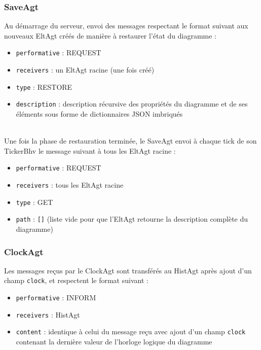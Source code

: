 \subsubsection{SaveAgt}
Au démarrage du serveur, envoi des messages respectant le format suivant aux nouveaux EltAgt créés de manière à restaurer l'état du diagramme :
\begin{itemize}
	\item \lstinline$performative$ : REQUEST
	\item \lstinline$receivers$ : un EltAgt racine (une fois créé)
	\item \lstinline$type$ : RESTORE
	\item \lstinline$description$ : description récursive des propriétés du diagramme et de ses éléments sous forme de dictionnaires JSON imbriqués
\end{itemize}
~\\
Une fois la phase de restauration terminée, le SaveAgt envoi à chaque tick de son TickerBhv le message suivant à tous les EltAgt racine :
\begin{itemize}
	\item \lstinline$performative$ : REQUEST
	\item \lstinline$receivers$ : tous les EltAgt racine
	\item \lstinline$type$ : GET
	\item \lstinline$path$ : \lstinline$[]$ (liste vide pour que l'EltAgt retourne la description complète du diagramme)
\end{itemize}

\subsubsection{ClockAgt}
Les messages reçus par le ClockAgt sont transférés au HistAgt après ajout d'un champ \lstinline$clock$, et respectent le format suivant :
\begin{itemize}
	\item \lstinline$performative$ : INFORM
	\item \lstinline$receivers$ : HistAgt
	\item \lstinline$content$ : identique à celui du message reçu avec ajout d'un champ \lstinline$clock$ contenant la dernière valeur de l'horloge logique du diagramme
\end{itemize}

